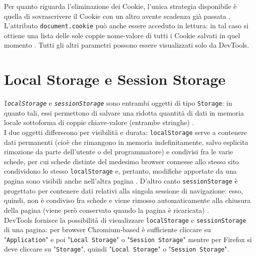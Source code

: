 \documentclass[a4paper, 12pt, twoside, openright]{book}
\begin{document}
Per quanto riguarda l'eliminazione dei Cookie, l'unica strategia disponibile è quella di sovrascrivere il Cookie con un altro avente scadenza già passata \cite{W3Schools:cookies}.\\
L'attributo \texttt{document.cookie} può anche essere acceduto in lettura: in tal caso si ottiene una lista delle sole coppie nome-valore di tutti i Cookie salvati in quel momento \cite{MDN_Web_docs:cookies}. Tutti gli altri parametri possono essere visualizzati solo da DevTools.

\section{Local Storage e Session Storage} %
\texttt{\textit{localStorage}} e \texttt{\textit{sessionStorage}} sono entrambi oggetti di tipo \texttt{Storage}: in quanto tali, essi permettono di salvare una ridotta quantità di dati in memoria locale sottoforma di coppie chiave-valore (entrambe stringhe) \cite{MDN_Web_docs:storage_API}.\\
I due oggetti differscono per visibilità e durata: \texttt{localStorage} serve a contenere dati permanenti (cioè che rimangono in memoria indefinitamente, salvo esplicita rimozione da parte dell'utente o del programmatore) e condivisi fra le varie schede, per cui schede distinte del medesimo browser connesse allo stesso sito condividono lo stesso \texttt{localStorage} e, pertanto, modifiche apportate da una pagina sono visibili anche nell'altra pagina \cite{MDN_Web_docs:localStorage}. D'altro canto \texttt{sessionStorage} è progettato per contenere dati relativi alla singola sessione di navigazione: esso, quindi, non è condiviso fra schede e viene rimosso automaticamente alla chiusura della pagina (viene però conservato quando la pagina è ricaricata) \cite{MDN_Web_docs:sessionStorage}.\\
DevTools fornisce la possibilità di visualizzare \texttt{localStorage} e \texttt{sessionStorage} di una pagina: per browser Chromium-based è sufficiente cliccare su "\texttt{Application}" e poi "\texttt{Local Storage}" o "\texttt{Session Storage}" mentre per Firefox si deve cliccare su "\texttt{Storage}", quindi "\texttt{Local Storage}" o "\texttt{Session Storage}".
\end{document}
